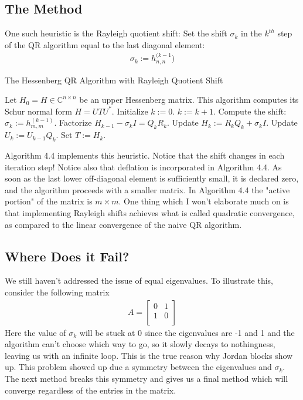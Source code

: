 \subsection{The Method}
One such heuristic is the Rayleigh quotient shift: Set the shift $\sigma_k$ in the $k^{th}$ step of the QR algorithm equal to the last diagonal element:
\begin{align}
    \sigma_k := h_{n,n}^{(k-1})
\end{align}
\begin{algorithm}
\caption{The Hessenberg QR Algorithm with Rayleigh Quotient Shift}
\begin{algorithmic}[1]
\STATE Let \(H_0 = H \in \mathbb{C}^{n \times n}\) be an upper Hessenberg matrix. This algorithm computes its Schur normal form \(H = UTU^*\).
\STATE Initialize \(k := 0\).
    \REPEAT
        \STATE \(k := k + 1\).
        \STATE Compute the shift: \(\sigma_k := h^{(k-1)}_{m,m}\).
        \STATE Factorize \(H_{k-1} - \sigma_k I = Q_kR_k\).
        \STATE Update \(H_k := R_kQ_k + \sigma_k I\).
        \STATE Update \(U_k := U_{k-1}Q_k\).
\ENDFOR
\STATE Set \(T := H_k\).
\end{algorithmic}
\end{algorithm}

Algorithm 4.4 implements this heuristic. Notice that the shift changes in each iteration step! Notice also that deflation is incorporated in Algorithm 4.4. As soon as the last lower off-diagonal element is sufficiently small, it is declared zero, and the algorithm proceeds with a smaller matrix. In Algorithm 4.4 the "active portion" of the matrix is $m \times m$. One thing which I won't elaborate much on is that implementing Rayleigh shifts achieves what is called quadratic convergence, as compared to the linear convergence of the naive QR algorithm. 
\subsection{Where Does it Fail?}
We still haven't addressed the issue of equal eigenvalues. To illustrate this, consider the following matrix
\begin{align}
    A = \begin{bmatrix}
        0 & 1\\
        1 & 0\\
    \end{bmatrix}
\end{align}
Here the value of $\sigma_k$ will be stuck at 0 since the eigenvalues are -1 and 1 and the algorithm can't choose which way to go, so it slowly decays to nothingness, leaving us with an infinite loop. This is the true reason why Jordan blocks show up. This problem showed up due a symmetry between the eigenvalues and $\sigma_k$. The next method breaks this symmetry and gives us a final method which will converge regardless of the entries in the matrix.

